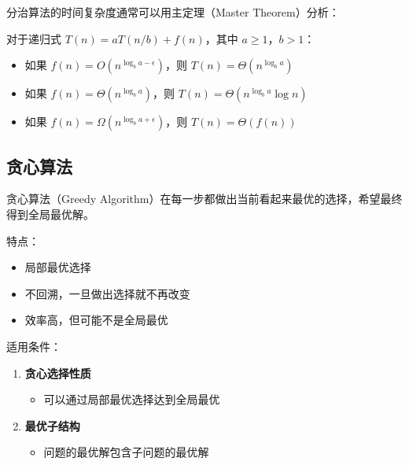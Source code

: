 分治算法的时间复杂度通常可以用主定理（Master Theorem）分析：

对于递归式 $T(n) = aT(n/b) + f(n)$，其中 $a \geq 1$，$b > 1$：
\begin{itemize}
  \item 如果 $f(n) = O(n^{\log_b a - \epsilon})$，则 $T(n) = \Theta(n^{\log_b a})$
  \item 如果 $f(n) = \Theta(n^{\log_b a})$，则 $T(n) = \Theta(n^{\log_b a} \log n)$
  \item 如果 $f(n) = \Omega(n^{\log_b a + \epsilon})$，则 $T(n) = \Theta(f(n))$
\end{itemize}

\subsection{贪心算法}


贪心算法（Greedy Algorithm）在每一步都做出当前看起来最优的选择，希望最终得到全局最优解。

特点：
\begin{itemize}
  \item 局部最优选择
  \item 不回溯，一旦做出选择就不再改变
  \item 效率高，但可能不是全局最优
\end{itemize}

适用条件：
\begin{enumerate}
  \item \textbf{贪心选择性质}
    \begin{itemize}
      \item 可以通过局部最优选择达到全局最优
    \end{itemize}

  \item \textbf{最优子结构}
    \begin{itemize}
      \item 问题的最优解包含子问题的最优解
    \end{itemize}
\end{enumerate}

